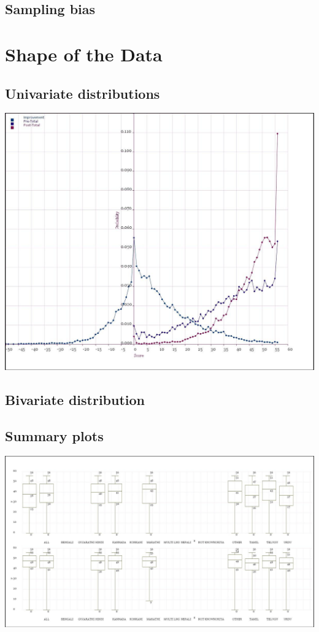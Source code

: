 \documentclass[10pt]{article}
\begin{document}
\subsection{Sampling bias}

\newpage
\section{Shape of the Data}
\subsection{Univariate distributions}
\includegraphics[width=160mm]{ReportMedia/ShapeOfData.jpg}
\subsection{Bivariate distribution}
\subsection{Summary plots}
\includegraphics[width=160mm]{ReportMedia/BoxPlotPrePost.jpg}
	
\end{document}
